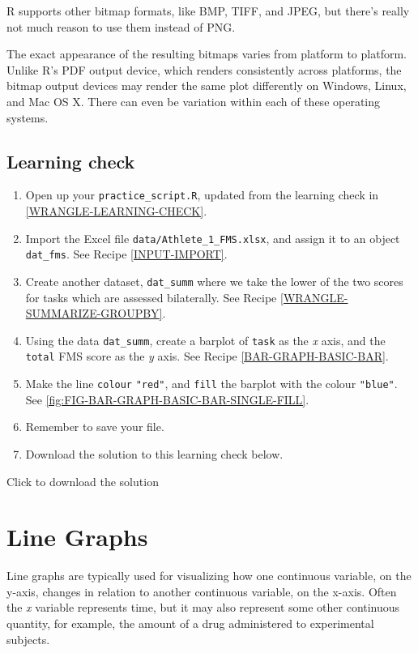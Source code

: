 \documentclass[
]{book}
\begin{document}
R supports other bitmap formats, like BMP, TIFF, and JPEG, but there's really not much reason to use them instead of PNG.

The exact appearance of the resulting bitmaps varies from platform to platform. Unlike R's PDF output device, which renders consistently across platforms, the bitmap output devices may render the same plot differently on Windows, Linux, and Mac OS X. There can even be variation within each of these operating systems.

\hypertarget{BAR-LEARNING-CHECK}{%
\section{Learning check}\label{BAR-LEARNING-CHECK}}

\begin{enumerate}
\def\labelenumi{\arabic{enumi}.}
\item
  Open up your \texttt{practice\_script.R}, updated from the learning check in \ref{WRANGLE-LEARNING-CHECK}.
\item
  Import the Excel file \texttt{data/Athlete\_1\_FMS.xlsx}, and assign it to an object \texttt{dat\_fms}. See Recipe \ref{INPUT-IMPORT}.
\item
  Create another dataset, \texttt{dat\_summ} where we take the lower of the two scores for tasks which are assessed bilaterally. See Recipe \ref{WRANGLE-SUMMARIZE-GROUPBY}.
\item
  Using the data \texttt{dat\_summ}, create a barplot of \texttt{task} as the \emph{x} axis, and the \texttt{total} FMS score as the \emph{y} axis. See Recipe \ref{BAR-GRAPH-BASIC-BAR}.
\item
  Make the line \texttt{colour} \texttt{"red"}, and \texttt{fill} the barplot with the colour \texttt{"blue"}. See \ref{fig:FIG-BAR-GRAPH-BASIC-BAR-SINGLE-FILL}.
\item
  Remember to save your file.
\item
  Download the solution to this learning check below.
\end{enumerate}

Click to download the solution

\hypertarget{line-graphs}{%
\chapter{Line Graphs}\label{line-graphs}}

Line graphs are typically used for visualizing how one continuous variable, on the y-axis, changes in relation to another continuous variable, on the x-axis. Often the \emph{x} variable represents time, but it may also represent some other continuous quantity, for example, the amount of a drug administered to experimental subjects.
\end{document}
